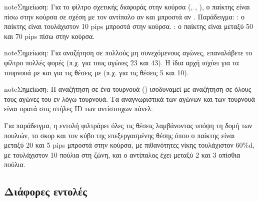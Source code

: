 \documentclass[letterpaper,10pt,greek]{sphinxmanual}
\begin{document}
\begin{sphinxadmonition}{note}{Σημείωση:}
\sphinxAtStartPar
Για το φίλτρο σχετικής διαφοράς στην κούρσα (, , ), ο παίκτης είναι πίσω στην κούρσα σε σχέση με τον αντίπαλο αν  και μπροστά αν . Παράδειγμα:  : ο παίκτης είναι τουλάχιστον 10 pips μπροστά στην κούρσα.  : ο παίκτης είναι μεταξύ 50 και 70 pips πίσω στην κούρσα.
\end{sphinxadmonition}

\begin{sphinxadmonition}{note}{Σημείωση:}
\sphinxAtStartPar
Για αναζήτηση σε πολλούς μη συνεχόμενους αγώνες, επαναλάβετε το φίλτρο  πολλές φορές (π.χ.  για τους αγώνες 23 και 43). Η ίδια αρχή ισχύει για τα τουρνουά με  και για τις θέσεις με  (π.χ.  για τις θέσεις 5 και 10).
\end{sphinxadmonition}

\begin{sphinxadmonition}{note}{Σημείωση:}
\sphinxAtStartPar
Η αναζήτηση σε ένα τουρνουά () ισοδυναμεί με αναζήτηση σε όλους τους αγώνες του εν λόγω τουρνουά. Τα αναγνωριστικά των αγώνων και των τουρνουά είναι ορατά στις στήλες ID των αντίστοιχων πάνελ.
\end{sphinxadmonition}

\sphinxAtStartPar
Για παράδειγμα, η εντολή  φιλτράρει όλες τις θέσεις λαμβάνοντας υπόψη τη δομή των πουλιών, το σκορ και τον κύβο της επεξεργασμένης θέσης όπου ο παίκτης είναι μεταξύ 20 και 5 pips μπροστά στην κούρσα, με πιθανότητες νίκης τουλάχιστον 60\%d, με τουλάχιστον 10 πούλια στη ζώνη, και ο αντίπαλος έχει μεταξύ 2 και 3 οπίσθια πούλια.


\subsection{Διάφορες εντολές}
\label{\detokenize{cmd_mode:commandes-diverses}}\label{\detokenize{cmd_mode:cmd-misc}}
\end{document}
